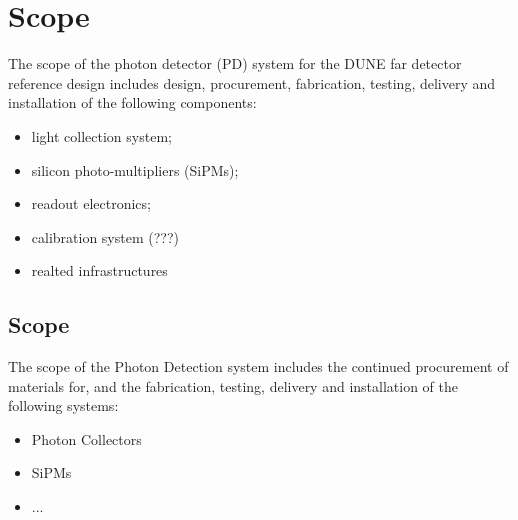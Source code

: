 \section{Scope}
The scope of the photon detector (PD) system for the DUNE far detector 
reference design includes design, procurement, fabrication, testing,
 delivery and installation of the following components:
\begin{itemize}
        \item light collection system;
        \item silicon photo-multipliers (SiPMs);
        \item readout electronics;
        \item calibration system (???)
        \item realted infrastructures
\end{itemize}

\subsection{Scope}
\label{sec:fdsp-pd-scope}

The scope of the Photon Detection system includes the continued procurement of materials for, and the fabrication, testing, delivery and installation of the following systems: 


\begin{itemize}
\item Photon Collectors 
\item SiPMs
\item ...
\end{itemize}
